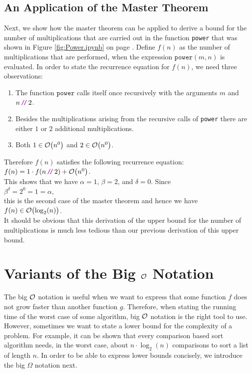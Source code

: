 \subsection{An Application of the Master Theorem}
Next, we show how the master theorem can be applied to derive a bound for the number of multiplications that
are carried out in the function \texttt{power} that was shown in Figure \ref{fig:Power.ipynb} on page
\pageref{fig:Power.ipynb}.  Define $f(n)$ as the number of multiplications that are performed, when the
expression $\mathtt{power}(m,n)$ is evaluated.  In order to state the recurrence equation for $f(n)$, we need
three observations:
\begin{enumerate}
\item The function $\texttt{power}$ calls itself once recursively with the arguments $m$ and $n\dv 2$.
\item Besides the multiplications arising from the recursive calls of \texttt{power} there are either
      $1$ or $2$ additional multiplications.
\item Both $1 \in \mathcal{O}\bigl(n^0\bigr)$ and $2 \in \mathcal{O}\bigl(n^0\bigr)$.
\end{enumerate}
Therefore $f(n)$ satisfies the following recurrence equation:
\\[0.2cm]
\hspace*{1.3cm}
$f(n) = 1 \cdot f(n \dv 2) + \Oh\bigl(n^0\bigr)$.
\\[0.2cm]
This shows that we have $\alpha = 1$, $\beta = 2$, and $\delta = 0$.  Since
\\[0.2cm]
\hspace*{1.3cm}
$\beta^\delta = 2^0 = 1 = \alpha$, 
\\[0.2cm]
this is the second case of the master theorem and hence we have
\\[0.2cm]
\hspace*{1.3cm}
$f(n) \in \mathcal{O}\bigl(\log_2(n)\bigr)$.
\\[0.2cm]
It should be obvious that this derivation of the upper bound for the number of multiplications is much less
tedious than our previous derivation of this upper bound.

\section{Variants of the Big $\mathcal{O}$ Notation}
The big $\mathcal{O}$ notation is useful when we want to express that some function $f$ does not grow faster
than another function $g$.  Therefore, when stating the running time of the worst case of some algorithm,
big $\mathcal{O}$ notation is the right tool to use.  However, sometimes we want to state a lower bound for
the complexity of a problem.  For example, it can be shown that every comparison based sort algorithm needs, in the worst case, about
$n \cdot \log_2(n)$ comparisons to sort a list of length $n$.  In order to be able to express lower
bounds concisely, we introduce the big $\Omega$ notation next.

